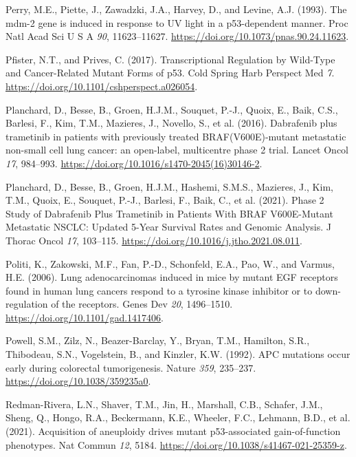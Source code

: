 \begin{CSLReferences}{0}{0}
\leavevmode{}%
Perry, M.E., Piette, J., Zawadzki, J.A., Harvey, D., and Levine, A.J. (1993). The mdm-2 gene is induced in response to UV light in a p53-dependent manner. Proc Natl Acad Sci U S A \emph{90}, 11623--11627. \url{https://doi.org/10.1073/pnas.90.24.11623}.

\leavevmode{}%
Pfister, N.T., and Prives, C. (2017). Transcriptional Regulation by Wild-Type and Cancer-Related Mutant Forms of p53. Cold Spring Harb Perspect Med \emph{7}. \url{https://doi.org/10.1101/cshperspect.a026054}.

\leavevmode{}%
Planchard, D., Besse, B., Groen, H.J.M., Souquet, P.-J., Quoix, E., Baik, C.S., Barlesi, F., Kim, T.M., Mazieres, J., Novello, S., et al. (2016). Dabrafenib plus trametinib in patients with previously treated BRAF(V600E)-mutant metastatic non-small cell lung cancer: an open-label, multicentre phase 2 trial. Lancet Oncol \emph{17}, 984--993. \url{https://doi.org/10.1016/s1470-2045(16)30146-2}.

\leavevmode{}%
Planchard, D., Besse, B., Groen, H.J.M., Hashemi, S.M.S., Mazieres, J., Kim, T.M., Quoix, E., Souquet, P.-J., Barlesi, F., Baik, C., et al. (2021). Phase 2 Study of Dabrafenib Plus Trametinib in Patients With BRAF V600E-Mutant Metastatic NSCLC: Updated 5-Year Survival Rates and Genomic Analysis. J Thorac Oncol \emph{17}, 103--115. \url{https://doi.org/10.1016/j.jtho.2021.08.011}.

\leavevmode{}%
Politi, K., Zakowski, M.F., Fan, P.-D., Schonfeld, E.A., Pao, W., and Varmus, H.E. (2006). Lung adenocarcinomas induced in mice by mutant EGF receptors found in human lung cancers respond to a tyrosine kinase inhibitor or to down-regulation of the receptors. Genes Dev \emph{20}, 1496--1510. \url{https://doi.org/10.1101/gad.1417406}.

\leavevmode{}%
Powell, S.M., Zilz, N., Beazer-Barclay, Y., Bryan, T.M., Hamilton, S.R., Thibodeau, S.N., Vogelstein, B., and Kinzler, K.W. (1992). APC mutations occur early during colorectal tumorigenesis. Nature \emph{359}, 235--237. \url{https://doi.org/10.1038/359235a0}.

\leavevmode{}%
Redman-Rivera, L.N., Shaver, T.M., Jin, H., Marshall, C.B., Schafer, J.M., Sheng, Q., Hongo, R.A., Beckermann, K.E., Wheeler, F.C., Lehmann, B.D., et al. (2021). Acquisition of aneuploidy drives mutant p53-associated gain-of-function phenotypes. Nat Commun \emph{12}, 5184. \url{https://doi.org/10.1038/s41467-021-25359-z}.


\end{CSLReferences}
